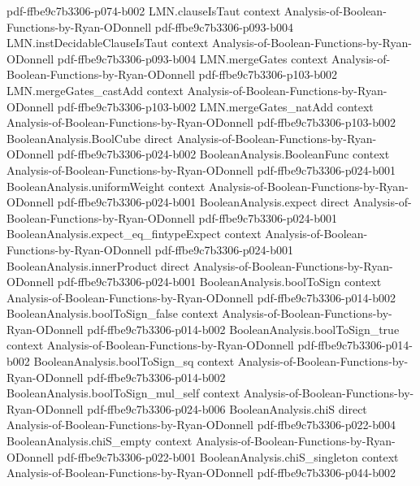 \begin{theorem}
  {pdf-ffbe9c7b3306-p074-b002}
\proofstep
  {LMN.clauseIsTaut}
  {context}
  {Analysis-of-Boolean-Functions-by-Ryan-ODonnell}
  {pdf-ffbe9c7b3306-p093-b004}
\proofstep
  {LMN.instDecidableClauseIsTaut}
  {context}
  {Analysis-of-Boolean-Functions-by-Ryan-ODonnell}
  {pdf-ffbe9c7b3306-p093-b004}
\proofstep
  {LMN.mergeGates}
  {context}
  {Analysis-of-Boolean-Functions-by-Ryan-ODonnell}
  {pdf-ffbe9c7b3306-p103-b002}
\proofstep
  {LMN.mergeGates_castAdd}
  {context}
  {Analysis-of-Boolean-Functions-by-Ryan-ODonnell}
  {pdf-ffbe9c7b3306-p103-b002}
\proofstep
  {LMN.mergeGates_natAdd}
  {context}
  {Analysis-of-Boolean-Functions-by-Ryan-ODonnell}
  {pdf-ffbe9c7b3306-p103-b002}
\proofstep
  {BooleanAnalysis.BoolCube}
  {direct}
  {Analysis-of-Boolean-Functions-by-Ryan-ODonnell}
  {pdf-ffbe9c7b3306-p024-b002}
\proofstep
  {BooleanAnalysis.BooleanFunc}
  {context}
  {Analysis-of-Boolean-Functions-by-Ryan-ODonnell}
  {pdf-ffbe9c7b3306-p024-b001}
\proofstep
  {BooleanAnalysis.uniformWeight}
  {context}
  {Analysis-of-Boolean-Functions-by-Ryan-ODonnell}
  {pdf-ffbe9c7b3306-p024-b001}
\proofstep
  {BooleanAnalysis.expect}
  {direct}
  {Analysis-of-Boolean-Functions-by-Ryan-ODonnell}
  {pdf-ffbe9c7b3306-p024-b001}
\proofstep
  {BooleanAnalysis.expect_eq_fintypeExpect}
  {context}
  {Analysis-of-Boolean-Functions-by-Ryan-ODonnell}
  {pdf-ffbe9c7b3306-p024-b001}
\proofstep
  {BooleanAnalysis.innerProduct}
  {direct}
  {Analysis-of-Boolean-Functions-by-Ryan-ODonnell}
  {pdf-ffbe9c7b3306-p024-b001}
\proofstep
  {BooleanAnalysis.boolToSign}
  {context}
  {Analysis-of-Boolean-Functions-by-Ryan-ODonnell}
  {pdf-ffbe9c7b3306-p014-b002}
\proofstep
  {BooleanAnalysis.boolToSign_false}
  {context}
  {Analysis-of-Boolean-Functions-by-Ryan-ODonnell}
  {pdf-ffbe9c7b3306-p014-b002}
\proofstep
  {BooleanAnalysis.boolToSign_true}
  {context}
  {Analysis-of-Boolean-Functions-by-Ryan-ODonnell}
  {pdf-ffbe9c7b3306-p014-b002}
\proofstep
  {BooleanAnalysis.boolToSign_sq}
  {context}
  {Analysis-of-Boolean-Functions-by-Ryan-ODonnell}
  {pdf-ffbe9c7b3306-p014-b002}
\proofstep
  {BooleanAnalysis.boolToSign_mul_self}
  {context}
  {Analysis-of-Boolean-Functions-by-Ryan-ODonnell}
  {pdf-ffbe9c7b3306-p024-b006}
\proofstep
  {BooleanAnalysis.chiS}
  {direct}
  {Analysis-of-Boolean-Functions-by-Ryan-ODonnell}
  {pdf-ffbe9c7b3306-p022-b004}
\proofstep
  {BooleanAnalysis.chiS_empty}
  {context}
  {Analysis-of-Boolean-Functions-by-Ryan-ODonnell}
  {pdf-ffbe9c7b3306-p022-b001}
\proofstep
  {BooleanAnalysis.chiS_singleton}
  {context}
  {Analysis-of-Boolean-Functions-by-Ryan-ODonnell}
  {pdf-ffbe9c7b3306-p044-b002}

\end{theorem}
